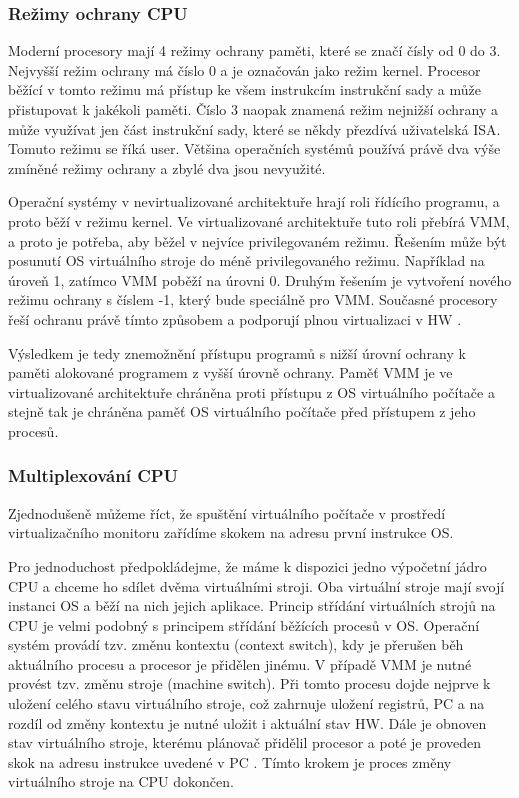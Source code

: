 \subsubsection{Režimy ochrany CPU}

Moderní procesory mají 4 režimy ochrany paměti, které se značí čísly od 0 do 3. Nejvyšší režim ochrany má číslo 0 a je označován jako režim kernel. Procesor běžící v tomto režimu má přístup ke všem instrukcím instrukční sady a může přistupovat
k jakékoli paměti. Číslo 3 naopak znamená režim nejnižší ochrany a může využívat jen část instrukční sady, které se někdy přezdívá uživatelská ISA. Tomuto režimu se říká user. Většina operačních systémů používá právě dva výše zmíněné režimy ochrany
a zbylé dva jsou nevyužité.

Operační systémy v nevirtualizované architektuře hrají roli řídícího programu, a proto běží v režimu kernel. Ve virtualizované architektuře tuto roli přebírá VMM, a proto je potřeba, aby běžel v nejvíce privilegovaném režimu. Řešením může být
posunutí OS virtuálního stroje do méně privilegovaného režimu. Například na úroveň 1, zatímco VMM poběží na úrovni 0. Druhým řešením je vytvoření nového režimu ochrany s číslem -1, který bude speciálně pro VMM. Současné procesory řeší ochranu právě tímto
způsobem a podporují plnou virtualizaci v HW \cite{virt2}.

Výsledkem je tedy znemožnění přístupu programů s nižší úrovní ochrany k paměti alokované programem z vyšší úrovně ochrany. Paměť VMM je ve virtualizované architektuře chráněna proti přístupu z OS virtuálního počítače a stejně tak je
chráněna paměť OS virtuálního počítače před přístupem z jeho procesů.

\subsubsection{Multiplexování CPU}

Zjednodušeně můžeme říct, že spuštění virtuálního počítače v prostředí virtualizačního monitoru zařídíme skokem na adresu první instrukce OS.

Pro jednoduchost předpokládejme, že máme k dispozici jedno výpočetní jádro CPU a chceme ho sdílet dvěma virtuálními stroji. Oba virtuální stroje mají svojí instanci OS a běží na nich jejich aplikace. Princip střídání virtuálních strojů
na CPU je velmi podobný s principem střídání běžících procesů v OS. Operační systém provádí tzv. změnu kontextu (context switch), kdy je přerušen běh aktuálního procesu a procesor je přidělen jinému. V případě VMM je nutné provést tzv. změnu stroje (machine switch).
Při tomto procesu dojde nejprve k uložení celého stavu virtuálního stroje, což zahrnuje uložení registrů, PC a na rozdíl od změny kontextu je nutné uložit i aktuální stav HW. Dále je obnoven stav virtuálního stroje, kterému plánovač přidělil procesor
a poté je proveden skok na adresu instrukce uvedené v PC \cite{vmm_book}. Tímto krokem je proces změny virtuálního stroje na CPU dokončen.

